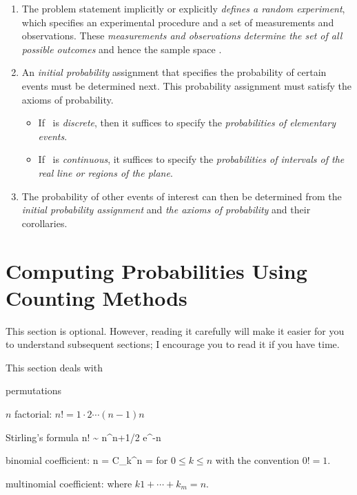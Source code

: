 \begin{enumerate}
	\item The problem statement implicitly or explicitly \emph{defines a random experiment},
	which specifies an experimental procedure and a set of measurements and observations.
	These \emph{measurements and observations determine the set of all possible outcomes}
	and hence the sample space \sspace.

	\item An \emph{initial probability} assignment that specifies the probability of certain events
	must be determined next. This probability assignment must satisfy the axioms of probability.
	\begin{itemize}
		\item If \sspace\ is \emph{discrete},
		then it suffices to specify the \emph{probabilities of elementary events}.
		\item If \sspace\ is \emph{continuous},
		it suffices to specify the \emph{probabilities of intervals of the real line
		or regions of the plane}.
	\end{itemize}

	\item The probability of other events of interest can then be determined
	from the \emph{initial probability assignment}
	and \emph{the axioms of probability} and their corollaries.
\end{enumerate}

\section{Computing Probabilities Using Counting Methods \optional}

This section is optional.
However, reading it carefully
will make it easier for you to understand subsequent sections;
I encourage you to read it if you have time.

This section deals with
\bit
	\item permutations
	\item $n$ factorial:  $n! = 1\cdot2\cdots (n-1)n$
	\item Stirling's formula
		n! \sim \sqrt{2\pi} n^{n+1/2} e^{-n}
	\eeql

	\item binomial coefficient:
		{n } = C_k^n = 
	\eeql
	for $0\leq k\leq n$ with the convention $0!=1$.

	\item multinomial coefficient:
	\eeql
	where $k1+\cdots+k_m = n$.

